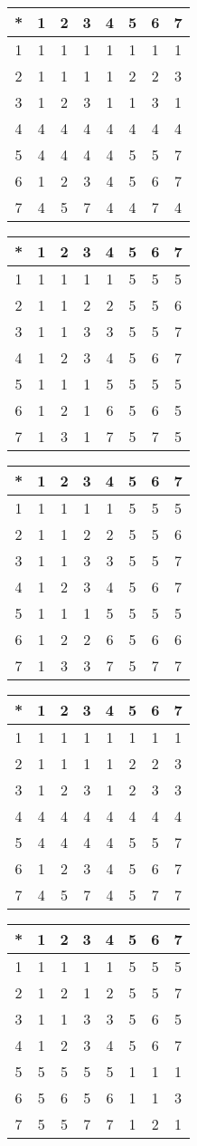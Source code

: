 \begin{tabular}[t]{c|ccccccc}
*&1&2&3&4&5&6&7 \\ \hline
    1&1&1&1&1&1&1&1 \\
    2&1&1&1&1&2&2&3 \\
    3&1&2&3&1&1&3&1 \\
    4&4&4&4&4&4&4&4 \\
    5&4&4&4&4&5&5&7 \\
    6&1&2&3&4&5&6&7 \\
    7&4&5&7&4&4&7&4 
\end{tabular}


\begin{tabular}[t]{c|ccccccc}
*&1&2&3&4&5&6&7 \\ \hline
    1&1&1&1&1&5&5&5 \\
    2&1&1&2&2&5&5&6 \\
    3&1&1&3&3&5&5&7 \\
    4&1&2&3&4&5&6&7 \\
    5&1&1&1&5&5&5&5 \\
    6&1&2&1&6&5&6&5 \\
    7&1&3&1&7&5&7&5 
\end{tabular}


\begin{tabular}[t]{c|ccccccc}
*&1&2&3&4&5&6&7 \\ \hline
    1&1&1&1&1&5&5&5 \\
    2&1&1&2&2&5&5&6 \\
    3&1&1&3&3&5&5&7 \\
    4&1&2&3&4&5&6&7 \\
    5&1&1&1&5&5&5&5 \\
    6&1&2&2&6&5&6&6 \\
    7&1&3&3&7&5&7&7 
\end{tabular}


\begin{tabular}[t]{c|ccccccc}
*&1&2&3&4&5&6&7 \\ \hline
    1&1&1&1&1&1&1&1 \\
    2&1&1&1&1&2&2&3 \\
    3&1&2&3&1&2&3&3 \\
    4&4&4&4&4&4&4&4 \\
    5&4&4&4&4&5&5&7 \\
    6&1&2&3&4&5&6&7 \\
    7&4&5&7&4&5&7&7 
\end{tabular}


\begin{tabular}[t]{c|ccccccc}
*&1&2&3&4&5&6&7 \\ \hline
    1&1&1&1&1&5&5&5 \\
    2&1&2&1&2&5&5&7 \\
    3&1&1&3&3&5&6&5 \\
    4&1&2&3&4&5&6&7 \\
    5&5&5&5&5&1&1&1 \\
    6&5&6&5&6&1&1&3 \\
    7&5&5&7&7&1&2&1 
\end{tabular}


